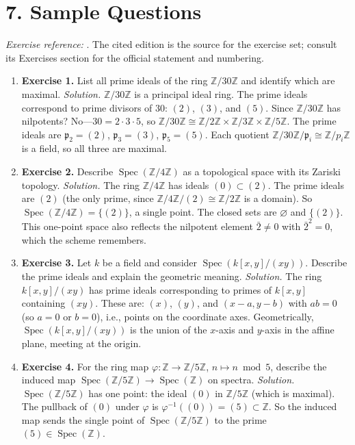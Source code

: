 \section*{7. Sample Questions}
\emph{Exercise reference:} \cite{scheme_ref1}. The cited edition is the source for the exercise set; consult its Exercises section for the official statement and numbering.
\begin{enumerate}[leftmargin=*,itemsep=0.9em]
\item \textbf{Exercise 1.} List all prime ideals of the ring $\mathbb{Z}/30\mathbb{Z}$ and identify which are maximal. \emph{Solution.} $\mathbb{Z}/30\mathbb{Z}$ is a principal ideal ring. The prime ideals correspond to prime divisors of $30$: $(2)$, $(3)$, and $(5)$. Since $\mathbb{Z}/30\mathbb{Z}$ has nilpotents? No---$30=2\cdot 3\cdot 5$, so $\mathbb{Z}/30\mathbb{Z}\cong\mathbb{Z}/2\mathbb{Z}\times\mathbb{Z}/3\mathbb{Z}\times\mathbb{Z}/5\mathbb{Z}$. The prime ideals are $\mathfrak{p}_2=(2)$, $\mathfrak{p}_3=(3)$, $\mathfrak{p}_5=(5)$. Each quotient $\mathbb{Z}/30\mathbb{Z}/\mathfrak{p}_i\cong\mathbb{Z}/p_i\mathbb{Z}$ is a field, so all three are maximal.

\item \textbf{Exercise 2.} Describe $\operatorname{Spec}(\mathbb{Z}/4\mathbb{Z})$ as a topological space with its Zariski topology. \emph{Solution.} The ring $\mathbb{Z}/4\mathbb{Z}$ has ideals $(0)\subset(2)$. The prime ideals are $(2)$ (the only prime, since $\mathbb{Z}/4\mathbb{Z}/(2)\cong\mathbb{Z}/2\mathbb{Z}$ is a domain). So $\operatorname{Spec}(\mathbb{Z}/4\mathbb{Z})=\{(2)\}$, a single point. The closed sets are $\varnothing$ and $\{(2)\}$. This one-point space also reflects the nilpotent element $\bar{2}\ne 0$ with $\bar{2}^2=0$, which the scheme remembers.

\item \textbf{Exercise 3.} Let $k$ be a field and consider $\operatorname{Spec}(k[x,y]/(xy))$. Describe the prime ideals and explain the geometric meaning. \emph{Solution.} The ring $k[x,y]/(xy)$ has prime ideals corresponding to primes of $k[x,y]$ containing $(xy)$. These are: $(x)$, $(y)$, and $(x-a,y-b)$ with $ab=0$ (so $a=0$ or $b=0$), i.e., points on the coordinate axes. Geometrically, $\operatorname{Spec}(k[x,y]/(xy))$ is the union of the $x$-axis and $y$-axis in the affine plane, meeting at the origin.

\item \textbf{Exercise 4.} For the ring map $\varphi\colon\mathbb{Z}\to\mathbb{Z}/5\mathbb{Z}$, $n\mapsto n\bmod 5$, describe the induced map $\operatorname{Spec}(\mathbb{Z}/5\mathbb{Z})\to\operatorname{Spec}(\mathbb{Z})$ on spectra. \emph{Solution.} $\operatorname{Spec}(\mathbb{Z}/5\mathbb{Z})$ has one point: the ideal $(0)$ in $\mathbb{Z}/5\mathbb{Z}$ (which is maximal). The pullback of $(0)$ under $\varphi$ is $\varphi^{-1}((0))=(5)\subset\mathbb{Z}$. So the induced map sends the single point of $\operatorname{Spec}(\mathbb{Z}/5\mathbb{Z})$ to the prime $(5)\in\operatorname{Spec}(\mathbb{Z})$.


\end{enumerate}
